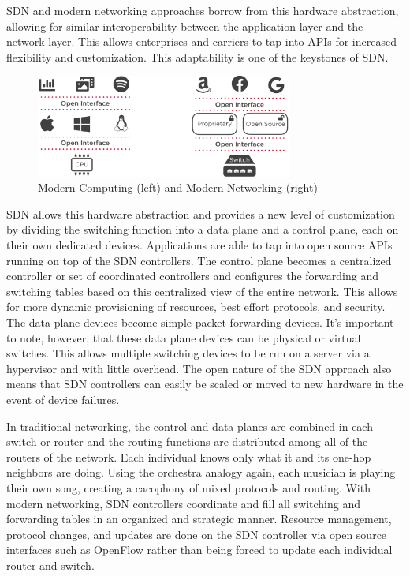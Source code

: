 \documentclass[11pt]{article}
\begin{document}
SDN and modern networking approaches borrow from this hardware abstraction, allowing for similar interoperability between the application layer and the network layer. This allows enterprises and carriers to tap into APIs for increased flexibility and customization. This adaptability is one of the keystones of SDN.

\begin{figure}
	\centering
	\includegraphics[width=0.75\textwidth]{ModernComparison}
	\caption[]{Modern Computing (left) and Modern Networking (right)\footnotemark\(^,\)\footnotemark}
\end{figure}

SDN allows this hardware abstraction and provides a new level of customization by dividing the switching function into a data plane and a control plane, each on their own dedicated devices. Applications are able to tap into open source APIs running on top of the SDN controllers. The control plane becomes a centralized controller or set of coordinated controllers and configures the forwarding and switching tables based on this centralized view of the entire network. This allows for more dynamic provisioning of resources, best effort protocols, and security. The data plane devices become simple packet-forwarding devices. It’s important to note, however, that these data plane devices can be physical or virtual switches. This allows multiple switching devices to be run on a server via a hypervisor and with little overhead. The open nature of the SDN approach also means that SDN controllers can easily be scaled or moved to new hardware in the event of device failures.

In traditional networking, the control and data planes are combined in each switch or router and the routing functions are distributed among all of the routers of the network. Each individual knows only what it and its one-hop neighbors are doing. Using the orchestra analogy again, each musician is playing their own song, creating a cacophony of mixed protocols and routing. With modern networking, SDN controllers coordinate and fill all switching and forwarding tables in an organized and strategic manner. Resource management, protocol changes, and updates are done on the SDN controller via open source interfaces such as OpenFlow rather than being forced to update each individual router and switch.
\end{document}
